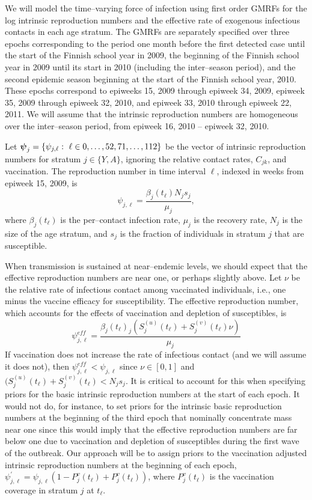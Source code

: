 We will model the time--varying force of infection using first order GMRFs for the log intrinsic reproduction numbers and the effective rate of exogenous infectious contacts in each age stratum. The GMRFs are separately specified over three epochs corresponding to the period one month before the first detected case until the start of the Finnish school year in 2009, the beginning of the Finnish school year in 2009 until its start in 2010 (including the inter--season period), and the second epidemic season beginning at the start of the Finnish school year, 2010. These epochs correspond to epiweeks 15, 2009 through epiweek 34, 2009, epiweek 35, 2009 through epiweek 32, 2010, and epiweek 33, 2010 through epiweek 22, 2011. We will assume that the intrinsic reproduction numbers are homogeneous over the inter--season period, from epiweek 16, 2010 -- epiweek 32, 2010.

Let $ \bpsi_{j} = \lbrace\psi_{j,\ell}:\ \ell \in 0,\dots,52,71,\dots,112\rbrace $ be the vector of intrinsic reproduction numbers for stratum $ j \in \lbrace Y,A \rbrace$, ignoring the relative contact rates, $ C_{jk} $, and vaccination. The reproduction number in time interval $ \ell $, indexed in weeks from epiweek 15, 2009, is
\begin{equation}
\label{eqn:R0t_novacc}
\psi_{j,\ell} = \frac{\beta_j(t_\ell)N_js_j}{\mu_j},
\end{equation}
where $ \beta_j(t_\ell) $ is the per--contact infection rate, $ \mu_j $ is the recovery rate, $ N_j $ is the size of the age stratum, and $ s_j $ is the fraction of individuals in stratum $ j $ that are susceptible.
 
When transmission is sustained at near--endemic levels, we should expect that the effective reproduction numbers are near one, or perhaps slightly above. Let $ \nu $ be the relative rate of infectious contact among vaccinated individuals, i.e., one minus the vaccine efficacy for susceptibility. The effective reproduction number, which accounts for the effects of vaccination and depletion of susceptibles, is 
\begin{equation}
\label{eqn:Reff_t}
\psi_{j,\ell}^{eff} = \frac{\beta_j(t_\ell)_j\left (S^{(u)}_j(t_\ell) + S^{(v)}_j(t_\ell)\nu\right )}{\mu_j}
\end{equation}
If vaccination does not increase the rate of infectious contact (and we will assume it does not), then $ \psi_{j,\ell}^{eff} < \psi_{j,\ell} $ since $ \nu\in[0,1] $ and $ (S^{(u)}_j(t_\ell) + S^{(v)}_j(t_\ell) < N_js_j $. It is critical to account for this when specifying priors for the basic intrinsic reproduction numbers at the start of each epoch. It would not do, for instance, to set priors for the intrinsic basic reproduction numbers at the beginning of the third epoch that nominally concentrate mass near one since this would imply that the effective reproduction numbers are far below one due to vaccination and depletion of susceptibles during the first wave of the outbreak. Our approach will be to assign priors to the vaccination adjusted intrinsic reproduction numbers at the beginning of each epoch, $ \psi_{j,\ell}^\prime = \psi_{j,\ell}  \left (1 - P^v_j(t_\ell) + P^v_j(t_\ell)\right ) $, where $ P_j^v(t_\ell) $ is the vaccination coverage in stratum $ j $ at $ t_\ell $. 

